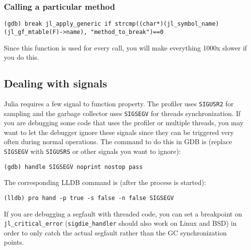 \hypertarget{11262037379695434792}{}


\subsubsection{Calling a particular method}




\begin{lstlisting}
(gdb) break jl_apply_generic if strcmp((char*)(jl_symbol_name)(jl_gf_mtable(F)->name), "method_to_break")==0
\end{lstlisting}



Since this function is used for every call, you will make everything 1000x slower if you do this.



\hypertarget{12553217263049394878}{}


\subsection{Dealing with signals}



Julia requires a few signal to function property. The profiler uses \texttt{SIGUSR2} for sampling and the garbage collector uses \texttt{SIGSEGV} for threads synchronization. If you are debugging some code that uses the profiler or multiple threads, you may want to let the debugger ignore these signals since they can be triggered very often during normal operations. The command to do this in GDB is (replace \texttt{SIGSEGV} with \texttt{SIGUSRS} or other signals you want to ignore):




\begin{lstlisting}
(gdb) handle SIGSEGV noprint nostop pass
\end{lstlisting}



The corresponding LLDB command is (after the process is started):




\begin{lstlisting}
(lldb) pro hand -p true -s false -n false SIGSEGV
\end{lstlisting}



If you are debugging a segfault with threaded code, you can set a breakpoint on \texttt{jl\_critical\_error} (\texttt{sigdie\_handler} should also work on Linux and BSD) in order to only catch the actual segfault rather than the GC synchronization points.



